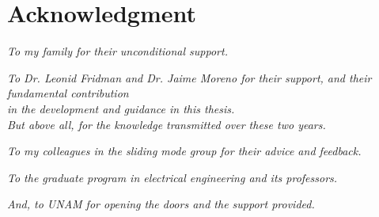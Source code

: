 \chapter*{Acknowledgment} 
\begin{flushright}
\textit{To my family for their unconditional support.}\vspace{0.5cm}

\textit{To Dr. Leonid Fridman and Dr. Jaime Moreno for their support, and their fundamental contribution \\ in the development and guidance in this thesis. \\ But above all, for the knowledge transmitted over these two years.}\vspace{0.5cm}

\textit{To my colleagues in the sliding mode group for their advice and feedback.}\vspace{0.5cm}

\textit{To the graduate program in electrical engineering and its professors.}\vspace{0.5cm}

\textit{And, to UNAM for opening the doors and the support provided.}

\end{flushright}

 